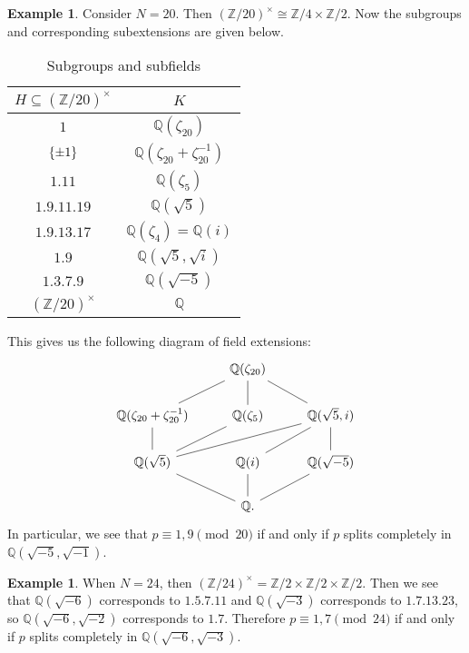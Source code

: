 \documentclass[leqno, openany]{memoir}
\theoremstyle{definition}
\newtheorem{exm}[thm]{Example}
\theoremstyle{remark}
\theoremstyle{plain}
\theoremstyle{definition}
\theoremstyle{remark}
\newcommand{\Z}{\mathbb{Z}}
\newcommand{\Q}{\mathbb{Q}}
\begin{document}
\begin{exm}
    Consider $N = 20$. Then ${(\Z/20)}^{\times} \cong \Z/4 \times \Z/2$. Now the subgroups and corresponding subextensions are given below.
    \begin{table}[H]
        \centering
        \caption{Subgroups and subfields}
        \label{tab:label}
        \begin{tabular}{cc}
        \toprule
        $H \subseteq {(\Z/20)}^{\times}$ & $K$ \\
        \midrule
        $\qty{1}$ & $\Q(\zeta_{20})$ \\
        $\qty{\pm 1}$ & $\Q(\zeta_{20}+\zeta_{20}^{-1})$ \\
        $\qty{1,11}$ & $\Q(\zeta_5)$ \\
        $\qty{1,9,11,19}$ & $\Q(\sqrt{5})$ \\
        $\qty{1,9,13,17}$ & $\Q(\zeta_4) = \Q(i)$ \\
        $\qty{1,9}$ & $\Q(\sqrt{5}, \sqrt{i})$ \\
        $\qty{1,3,7,9}$ & $\Q(\sqrt{-5})$ \\
        ${(\Z/20)}^{\times}$ & $\Q$ \\
        \bottomrule
        \end{tabular}
    \end{table}
    This gives us the following diagram of field extensions:
    \begin{equation*}
    \begin{tikzcd}
        & \Q(\zeta_{20}) \ar[dash]{d} \ar[dash]{dl} \ar[dash]{dr} \\
        \Q(\zeta_{20} + \zeta_{20}^{-1}) \ar[dash]{d} & \Q(\zeta_5) \ar[dash]{dl} & \Q(\sqrt{5}, i) \ar[dash]{dll} \ar[dash]{dl} \ar[dash]{d} \\
        \Q(\sqrt{5}) \ar[dash]{dr} & \Q(i) \ar[dash]{d} & \Q(\sqrt{-5}) \ar[dash]{dl} \\
                                   & \Q.
    \end{tikzcd}
    \end{equation*}
    In particular, we see that $p \equiv 1,9 \pmod{20}$ if and only if $p$ splits completely in $\Q(\sqrt{-5}, \sqrt{-1})$.
\end{exm}

\begin{exm}
    When $N = 24$, then ${(\Z/24)}^{\times} = \Z/2 \times \Z/2 \times \Z/2$. Then we see that $\Q(\sqrt{-6})$ corresponds to $\qty{1,5,7,11}$ and $\Q(\sqrt{-3})$ corresponds to $\qty{1,7,13,23}$, so $\Q(\sqrt{-6}, \sqrt{-2})$ corresponds to $\qty{1,7}$. Therefore $p \equiv 1,7 \pmod{24}$ if and only if $p$ splits completely in $\Q(\sqrt{-6}, \sqrt{-3})$.
\end{exm}
\end{document}
